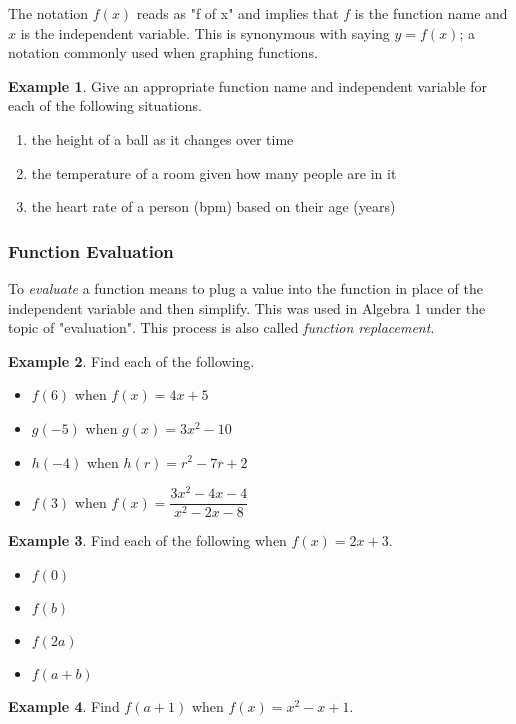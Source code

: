 \documentclass[addpoints,12pt]{exam}
\theoremstyle{definition}
\newtheorem{example}{Example}[subsection]
\begin{document}
\vspace{.2in}

The notation $f(x)$ reads as "f of x" and implies that $f$ is the function name and $x$ is the independent variable. This is synonymous with saying $y = f(x)$; a notation commonly used when graphing functions.
\vspace{.2in}
\begin{example}
Give an appropriate function name and independent variable for each of the following situations.
\begin{enumerate}
\item the height of a ball as it changes over time
\vspace{.25in}
\item the temperature of a room given how many people are in it
\vspace{.25in}
\item the heart rate of a person (bpm) based on their age (years)
\vspace{.25in}
\end{enumerate}
\end{example}

\newpage
\subsubsection*{Function Evaluation}

To \emph{evaluate} a function means to plug a value into the function in place of the independent variable and then simplify. This was used in Algebra 1 under the topic of "evaluation". This process is also called \emph{function replacement}.

\begin{example}
Find each of the following.
\begin{itemize}
\item $f(6)$ when $f(x) = 4x+5$
\vspace{1.5in}
\item $g(-5)$ when $g(x) = 3x^2 - 10$
\vspace{1.5in}
\item $h(-4)$ when $h(r) = r^2 - 7r +2$
\vspace{1.5in}
\item $f(3)$ when $f(x) = \dfrac{3x^2-4x-4}{ x^2-2x-8} $
\vspace{1.5in}
\end{itemize}
\end{example}
\newpage
\begin{example}
Find each of the following when $f(x) = 2x+3$.
\begin{itemize}
\item $f(0)$
\vspace{1in}
\item $f(b)$
\vspace{1in}
\item $f(2a)$
\vspace{1in}
\item $f(a+b)$
\vspace{1in}
\end{itemize}
\end{example}
\begin{example}
Find $f(a+1)$ when $f(x) = x^2 - x + 1$.
\end{example}
\end{document}
